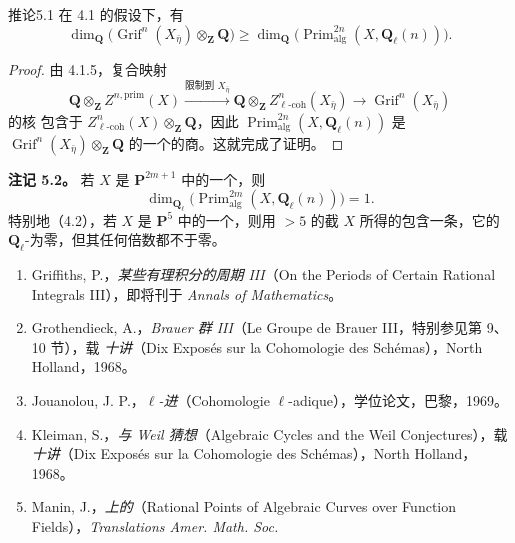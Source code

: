 \begin{SGAresult}{推论}{5.1}
在 4.1 的假设下，有
\begin{equation}\tag{5.1.1}
\dim_{\mathbf Q}\bigl(\operatorname{Grif}^{n}(X_{\bar\eta})\otimes_{\mathbf Z}\mathbf Q\bigr)\geq\dim_{\mathbf Q}\bigl(\operatorname{Prim}^{2n}_{\mathrm{alg}}(X,\mathbf Q_\ell(n))\bigr).
\end{equation}
\end{SGAresult}
\begin{proof}
由 4.1.5，复合映射
\[
\mathbf Q\otimes_{\mathbf Z}Z^{n,\mathrm{prim}}(X)\xrightarrow{\text{限制到 }X_{\bar\eta}}\mathbf Q\otimes_{\mathbf Z}Z^n_{\ell\text{-}\mathrm{coh}}(X_{\bar\eta})\longrightarrow\operatorname{Grif}^n(X_{\bar\eta})
\]
的核
包含于 $Z^n_{\ell\text{-}\mathrm{coh}}(X)\otimes_{\mathbf Z}\mathbf Q$，因此 $\operatorname{Prim}^{2n}_{\mathrm{alg}}(X,\mathbf Q_\ell(n))$ 是 $\operatorname{Grif}^n(X_{\bar\eta})\otimes_{\mathbf Z}\mathbf Q$ 的一个的商。这就完成了证明。
\end{proof}
\textbf{注记 5.2。} 若 $X$ 是 $\mathbf P^{2m+1}$ 中的一个，则
\[\dim_{\mathbf Q_\ell}\bigl(\operatorname{Prim}^{2m}_{\mathrm{alg}}(X,\mathbf Q_\ell(n))\bigr)=1.\]
特别地（4.2），若 $X$ 是 $\mathbf P^5$ 中的一个，则用 $>5$ 的截 $X$ 所得的包含一条，它的 $\mathbf Q_\ell$-为零，但其任何倍数都不于零。

\begin{enumerate}
\item[{[1]}] Griffiths, P.，\emph{某些有理积分的周期 III}（On the Periods of Certain Rational Integrals III），即将刊于 \emph{Annals of Mathematics}。
\item[{[2]}] Grothendieck, A.，\emph{Brauer 群 III}（Le Groupe de Brauer III，特别参见第 9、10 节），载 \emph{十讲}（Dix Exposés sur la Cohomologie des Schémas），North Holland，1968。
\item[{[3]}] Jouanolou, J. P.，\emph{$\ell$-进}（Cohomologie $\ell$-adique），学位论文，巴黎，1969。
\item[{[4]}] Kleiman, S.，\emph{与 Weil 猜想}（Algebraic Cycles and the Weil Conjectures），载 \emph{十讲}（Dix Exposés sur la Cohomologie des Schémas），North Holland，1968。
\item[{[5]}] Manin, J.，\emph{上的}（Rational Points of Algebraic Curves over Function Fields），\emph{Translations Amer. Math. Soc.}
\end{enumerate}
